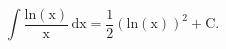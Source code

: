 \[ \int \frac{\mathrm{ln(x)}}{\mathrm{x}} \, \mathrm{dx}
= \frac{1}{2} \left ( \mathrm{ln(x)} \right ) ^2 + \mathrm{C} . \]